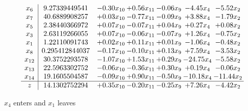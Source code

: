 \documentclass[9pt]{article}
\begin{document}
 \[\begin{array}{c| c c@{\hskip 2pt} c@{\hskip 2pt} c@{\hskip 2pt} c@{\hskip 2pt} c@{\hskip 2pt} }
 x_{6}   &  9.27339449541 & -0.30 x_{10} & +  0.56 x_{11} & -0.06 x_{9} & -4.45 x_{4} & -5.52 x_{2}\\
 x_{7}   &  40.6889908257 & +  0.03 x_{10} & -0.77 x_{11} & -0.09 x_{9} & +  3.88 x_{4} & -1.79 x_{2}\\
 x_{5}   &  2.38440366972 & +  0.07 x_{10} & -0.07 x_{11} & +  0.04 x_{9} & +  0.27 x_{4} & +  0.08 x_{2}\\
 x_{3}   &  2.63119266055 & +  0.07 x_{10} & -0.06 x_{11} & -0.07 x_{9} & +  1.26 x_{4} & -0.75 x_{2}\\
 x_{1}   &  1.22110091743 & +  0.02 x_{10} & +  0.11 x_{11} & +  0.01 x_{9} & -1.06 x_{4} & -0.48 x_{2}\\
 x_{8}   &  0.295412844037 & -0.17 x_{10} & -0.10 x_{11} & +  0.13 x_{9} & +  7.59 x_{4} & -3.53 x_{2}\\
 x_{12}   &  30.3752293578 & -1.07 x_{10} & +  1.53 x_{11} & +  0.29 x_{9} & -24.75 x_{4} & -5.58 x_{2}\\
 x_{13}   &  22.5963302752 & -0.06 x_{10} & -0.36 x_{11} & +  0.30 x_{9} & +  0.19 x_{4} & -0.06 x_{2}\\
 x_{14}   &  19.1605504587 & -0.09 x_{10} & +  0.90 x_{11} & -0.50 x_{9} & -10.18 x_{4} & -11.44 x_{2}\\
\hline
z    &  14.1302752294 & +  0.35 x_{10} & -0.20 x_{11} & -0.25 x_{9} & +  7.26 x_{4} & -4.42 x_{2}\\
\end{array}\]


 $ x_{4} $ enters and $ x_{1} $ leaves 
\end{document}
